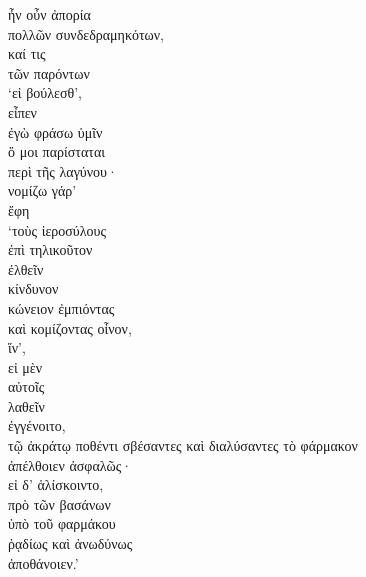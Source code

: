 {\large
\begin{greek}
\noindent ἦν οὖν ἀπορία \\
\tabto{2em} πολλῶν συνδεδραμηκότων, \\
καί τις \\
\tabto{2em} τῶν παρόντων \\
‘εἰ βούλεσθ', \\
εἶπεν\\
ἐγὼ φράσω ὑμῖν \\
\tabto{2em} ὅ μοι παρίσταται \\
\tabto{4em} περὶ τῆς λαγύνου· \\
νομίζω γάρ’ \\
\tabto{2em} ἔφη \\
‘τοὺς ἱεροσύλους \\
\tabto{2em} ἐπὶ τηλικοῦτον \\
ἐλθεῖν \\
\tabto{2em} κίνδυνον \\
κώνειον ἐμπιόντας \\
καὶ κομίζοντας οἶνον, \\
ἵν', \\
\tabto{2em} εἰ μὲν \\
\tabto{4em} αὐτοῖς \\
\tabto{4em} λαθεῖν \\
\tabto{2em} ἐγγένοιτο, \\
τῷ ἀκράτῳ ποθέντι σβέσαντες καὶ διαλύσαντες τὸ φάρμακον \\
\tabto{2em} ἀπέλθοιεν ἀσφαλῶς· \\
\tabto{2em} εἰ δ' ἁλίσκοιντο, \\
\tabto{4em} πρὸ τῶν βασάνων \\
\tabto{4em} ὑπὸ τοῦ φαρμάκου \\
\tabto{2em} ῥᾳδίως καὶ ἀνωδύνως \\
\tabto{2em} ἀποθάνοιεν.’\\

\end{greek}
}

